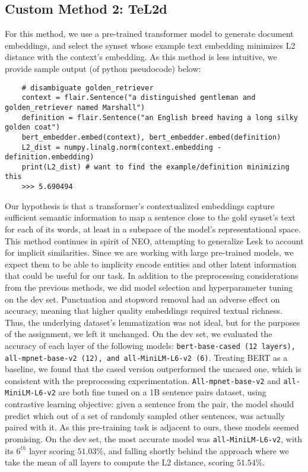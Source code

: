 \documentclass[11pt]{article}
\begin{document}
\subsection{Custom Method 2: TeL2d}
\vspace{-1ex}
For this method, we use a pre-trained transformer
model to generate document embeddings, and select the synset whose example text 
embedding minimizes L2 distance with the context's embedding. As this method is less 
intuitive, we provide sample output (of python pseudocode) below:
\vspace{-1ex}
\begin{verbatim}
    # disambiguate golden_retriever
    context = flair.Sentence("a distinguished gentleman and golden_retriever named Marshall")
    definition = flair.Sentence("an English breed having a long silky golden coat")
    bert_embedder.embed(context), bert_embedder.embed(definition)
    L2_dist = numpy.linalg.norm(context.embedding - definition.embedding)
    print(L2_dist) # want to find the example/definition minimizing this
    >>> 5.690494
    \end{verbatim}
\vspace{-4ex}
Our hypothesis is that a transformer's contextualized embeddings capture
sufficient semantic information to map a sentence close to the gold synset's
text for each of its words, at least in a subspace of the model's representational space.
This method continues in spirit of NEO, attempting to generalize Lesk 
to account for implicit similarities. Since we are working with large pre-trained 
models, we expect them to be able to implicity encode entities and other latent information
that could be useful for our task. In addition to the preprocessing considerations from the previous methods, 
we did model selection and hyperparameter tuning on the dev set.
Punctuation and stopword removal had an adverse effect on accuracy, meaning that 
higher quality embeddings required textual richness. 
Thus, the underlying dataset's lemmatization was not ideal, but 
for the purposes of the assignment, we left it unchanged. 
On the dev set, we evaluated the accuracy of each layer of the following models: 
\texttt{bert-base-cased (12 layers), all-mpnet-base-v2 (12), and all-MiniLM-L6-v2 (6)}. 
Treating BERT as a baseline, we found that the cased version outperformed the uncased one, 
which is consistent with the preprocessing experimentation. \texttt{All-mpnet-base-v2} and \texttt{all-MiniLM-L6-v2} 
are both fine tuned on a 1B sentence pairs dataset, using contrastive learning objective: 
given a sentence from the pair, the model should predict which out of a set of randomly sampled other sentences, 
was actually paired with it. As this pre-training task is adjacent to ours, these models seemed promising.
On the dev set, the most accurate model was \texttt{all-MiniLM-L6-v2}, with its $6^{th}$ layer scoring $51.03$\%,
and falling shortly behind the approach where we take the mean of all layers to compute the L2 distance, scoring $51.54\%$.
\vspace{-2ex}
\end{document}
